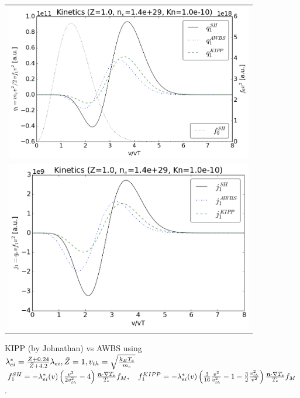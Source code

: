 \documentclass[preprint,12pt]{elsarticle}
\newcounter{bla}
\begin{document}
\begin{figure}[tbh]
  \begin{center}
    \begin{tabular}{c}
      \includegraphics[width=1.0\textwidth]{../VFPdata/KIPP_q_kinetics.png} \\
      \includegraphics[width=1.0\textwidth]{../VFPdata/KIPP_j_kinetics.png}
    \end{tabular}
  \caption{KIPP (by Johnathan) vs AWBS using 
  $\lambda_{ei}^* = \frac{\bar{Z} + 0.24}{\bar{Z} + 4.2}\lambda_{ei}, \bar{Z}=1, 
  v_{th} = \sqrt{\frac{k_B T_e}{m_e}}$ 
  $f_1^{SH} = -\lambda_{ei}^*(v) \left(\frac{v^2}{2 v_{th}^2} - 4\right) 
  \frac{\boldsymbol{n}\cdot\nabla T_e}{T_e} f_M,\quad 
  f_1^{KIPP} = -\lambda_{ei}^*(v) \left(\frac{3}{16}\frac{v^2}{v_{th}^2} - 1 
  - \frac{3}{2}\frac{v_{th}^2}{v^2} \right) 
  \frac{\boldsymbol{n}\cdot\nabla T_e}{T_e} f_M$.
  }
  \end{center}
  \label{fig:}
\end{figure}
\end{document}
